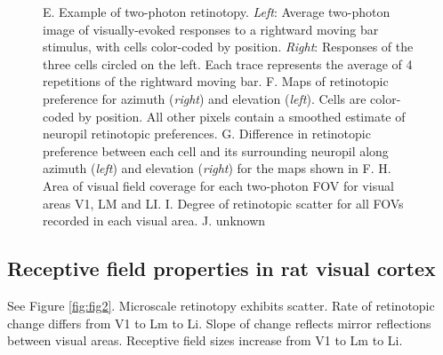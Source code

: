 \documentclass{article}
\begin{document}
\begin{figure}[ht]
  E.  Example of two-photon retinotopy. \textit{Left}: Average two-photon image of visually-evoked responses to a rightward moving bar stimulus, with cells color-coded by position. \textit{Right}:  Responses of the three cells circled on the left. Each trace represents the average of 4 repetitions of the rightward moving bar.
  F.  Maps of retinotopic preference for azimuth (\textit{right}) and elevation (\textit{left}).  Cells are color-coded by position. All other pixels contain a smoothed estimate of neuropil retinotopic preferences.
  G.  Difference in retinotopic preference between each cell and its surrounding neuropil along azimuth (\textit{left}) and elevation (\textit{right}) for the maps shown in F.
  H.  Area of visual field coverage for each two-photon FOV for visual areas V1, LM and LI. 
  I.  Degree of retinotopic scatter for all FOVs recorded in each visual area.
  J.  unknown
  \label{fig:fig1}
\end{figure}


\subsection{Receptive field properties in rat visual cortex}
See Figure \ref{fig:fig2}. Microscale retinotopy exhibits scatter. Rate of retinotopic change differs from V1 to Lm to Li. Slope of change reflects mirror reflections between visual areas. Receptive field sizes increase from V1 to Lm to Li. 
\end{document}
